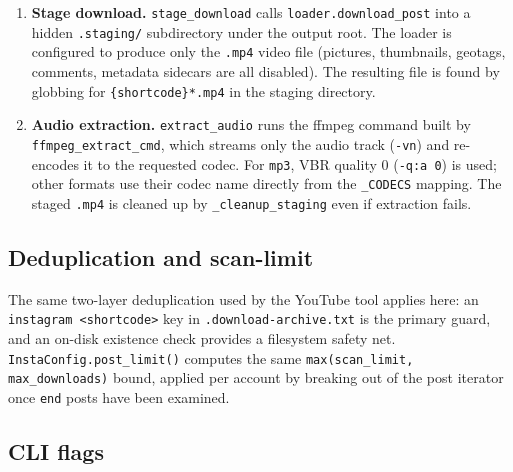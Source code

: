 \documentclass[11pt,a4paper]{report}
\newcommand{\code}[1]{\texttt{\small #1}}
\begin{document}
\begin{enumerate}[leftmargin=1.6em]
  \item \textbf{Stage download.}  \code{stage\_download} calls
        \code{loader.download\_post} into a hidden \code{.staging/} subdirectory
        under the output root.  The loader is configured to produce only the
        \code{.mp4} video file (pictures, thumbnails, geotags, comments, metadata
        sidecars are all disabled).  The resulting file is found by globbing for
        \code{*\{shortcode\}*.mp4} in the staging directory.
  \item \textbf{Audio extraction.}  \code{extract\_audio} runs the ffmpeg command
        built by \code{ffmpeg\_extract\_cmd}, which streams only the audio track
        (\code{-vn}) and re-encodes it to the requested codec.  For \code{mp3},
        VBR quality 0 (\code{-q:a 0}) is used; other formats use their codec
        name directly from the \code{\_CODECS} mapping.  The staged \code{.mp4}
        is cleaned up by \code{\_cleanup\_staging} even if extraction fails.
\end{enumerate}

\subsection{Deduplication and scan-limit}

The same two-layer deduplication used by the YouTube tool applies here: an
\code{instagram <shortcode>} key in \code{.download-archive.txt} is the primary
guard, and an on-disk existence check provides a filesystem safety net.
\code{InstaConfig.post\_limit()} computes the same
\code{max(scan\_limit, max\_downloads)} bound, applied per account by breaking out
of the post iterator once \code{end} posts have been examined.

\subsection{CLI flags}
\end{document}
